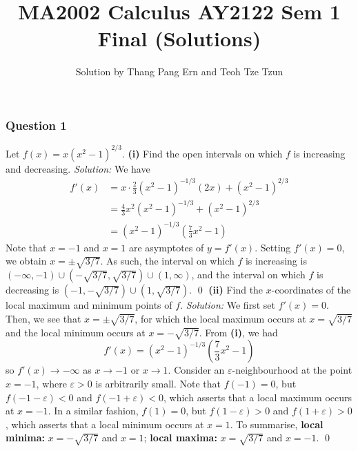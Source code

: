 \documentclass{article}
\title{MA2002 Calculus AY2122 Sem 1 Final (Solutions)}
\author{Solution by Thang Pang Ern and Teoh Tze Tzun}
\begin{document}
\maketitle
\subsubsection*{Question 1}
Let $f(x)=x(x^2-1)^{2/3}$.
\newline
\textbf{(i)} Find the open intervals on which $f$ is increasing and decreasing.
\newline\newline\textit{Solution:} We have \begin{align*}
    f'(x)&=x\cdot\frac{2}{3}(x^2-1)^{-1/3}(2x)+(x^2-1)^{2/3}\\&=\frac{4}{3}x^2(x^2-1)^{-1/3}+(x^2-1)^{2/3}\\&=(x^2-1)^{-1/3}\left(\frac{7}{3}x^2-1\right)
\end{align*} Note that $x=-1$ and $x=1$ are asymptotes of $y=f'(x)$. Setting $f'(x)=0$, we obtain $x=\pm\sqrt{3/7}$. As such, the interval on which $f$ is increasing is $\left( -\infty ,-1 \right)\cup \left( -\sqrt{3/7},\sqrt{3/7} \right)\cup \left( 1,\infty  \right)$, and the interval on which $f$ is decreasing is $\left( -1,-\sqrt{3/7} \right)\cup \left( 1,\sqrt{3/7} \right)$. \qed
\newline
\newline\textbf{(ii)} Find the $x$-coordinates of the local maximum and minimum points of $f$.
\newline
\newline\textit{Solution:} We first set $f'(x)=0$.  Then, we see that $x=\pm\sqrt{3/7}$, for which the local maximum occurs at $x=\sqrt{3/7}$ and the local minimum occurs at $x=-\sqrt{3/7}$.
\newline\newline From \textbf{(i)}, we had \[f'(x)=(x^2-1)^{-1/3}\left(\frac{7}{3}x^2-1\right)\] so $f'(x)\rightarrow-\infty$ as $x\rightarrow -1$ or $x\rightarrow 1$. Consider an $\varepsilon$-neighbourhood at the point $x=-1$, where $\varepsilon>0$ is arbitrarily small. Note that $f(-1)=0$, but $f(-1-\varepsilon)<0$ and $f(-1+\varepsilon)<0$, which asserts that a local maximum occurs at $x=-1$. In a similar fashion, $f(1)=0$, but $f(1-\varepsilon)>0$ and $f(1+\varepsilon)>0$, which asserts that a local minimum occurs at $x=1$.
\newline\newline To summarise, \textbf{local minima:} $x=-\sqrt{3/7}$ and $x=1$; \textbf{local maxima:} $x=\sqrt{3/7}$ and $x=-1$. \qed
\end{document}
